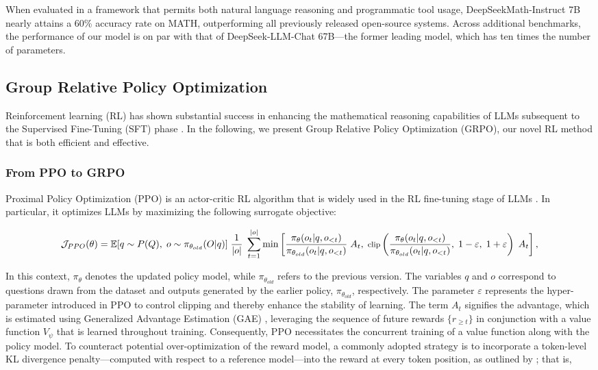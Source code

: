 \begin{itemize}[topsep=0pt]
\begin{itemize}[topsep=0pt]
When evaluated in a framework that permits both natural language reasoning and programmatic tool usage, DeepSeekMath-Instruct 7B nearly attains a 60\% accuracy rate on MATH, outperforming all previously released open-source systems. Across additional benchmarks, the performance of our model is on par with that of DeepSeek-LLM-Chat 67B—the former leading model, which has ten times the number of parameters.

\subsection{Group Relative Policy Optimization} Reinforcement learning (RL) has shown substantial success in enhancing the mathematical reasoning capabilities of LLMs subsequent to the Supervised Fine-Tuning (SFT) phase \citep{wang2023math,wizardmath}. In the following, we present Group Relative Policy Optimization (GRPO), our novel RL method that is both efficient and effective.

\subsubsection{From PPO to GRPO} Proximal Policy Optimization (PPO) \citep{schulman2017proximal} is an actor-critic RL algorithm that is widely used in the RL fine-tuning stage of LLMs \citep{ouyang2022training}. In particular, it optimizes LLMs by maximizing the following surrogate objective:

\begin{equation}
\footnotesize
    \mathcal{J}_{PPO}(\theta) = \mathbb{E}{[q \sim P(Q),\ o \sim \pi_{\theta_{old}}(O|q)]}\ \frac{1}{|o|}\ \sum_{t=1}^{|o|} \min \left[ \frac{\pi_\theta(o_{t} | q, o_{<t})}{\pi_{\theta_{old}}(o_{t} | q, o_{<t})}\ A_{t},\ \text{clip} \left(\frac{\pi_\theta(o_{t} | q, o_{<t})}{\pi_{\theta_{old}}(o_{t} | q, o_{<t})},\ 1 - \varepsilon,\ 1 + \varepsilon \right)\ A_{t} \right] ,
\end{equation}

In this context, $\pi_{\theta}$ denotes the updated policy model, while $\pi_{\theta_{old}}$ refers to the previous version. The variables $q$ and $o$ correspond to questions drawn from the dataset and outputs generated by the earlier policy, $\pi_{\theta_{old}}$, respectively. The parameter $\varepsilon$ represents the hyper-parameter introduced in PPO to control clipping and thereby enhance the stability of learning. The term $A_t$ signifies the advantage, which is estimated using Generalized Advantage Estimation (GAE) \citep{gae}, leveraging the sequence of future rewards $\{r_{\ge t}\}$ in conjunction with a value function $V_{\psi}$ that is learned throughout training. Consequently, PPO necessitates the concurrent training of a value function along with the policy model. To counteract potential over-optimization of the reward model, a commonly adopted strategy is to incorporate a token-level KL divergence penalty—computed with respect to a reference model—into the reward at every token position, as outlined by \citep{ouyang2022training}; that is,


\end{itemize}
\end{itemize}
